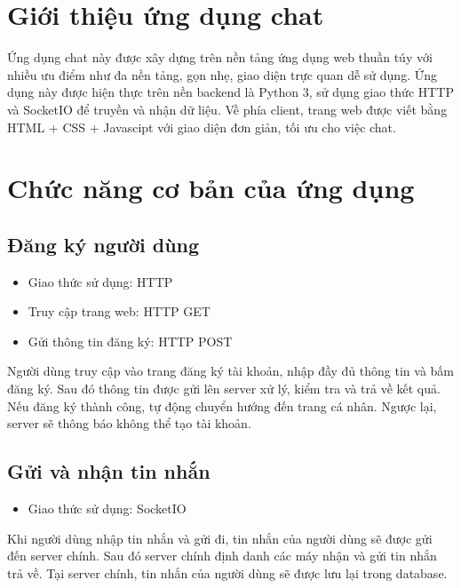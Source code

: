 \documentclass[a4paper]{article}
\begin{document}

\newpage
\tableofcontents
\newpage
\section{Giới thiệu ứng dụng chat}
	Ứng dụng chat này được xây dựng trên nền tảng ứng dụng web thuần túy với nhiều ưu điểm như đa nền tảng, gọn nhẹ, giao diện trực quan dễ sử dụng. Ứng dụng này được hiện thực trên nền backend là Python 3, sử dụng giao thức HTTP và SocketIO để truyền và nhận dữ liệu. Về phía client, trang web được viết bằng HTML + CSS + Javascipt với giao diện đơn giản, tối ưu cho việc chat.
	
\section{Chức năng cơ bản của ứng dụng}
	\subsection{Đăng ký người dùng}
		\begin{itemize}
			\item Giao thức sử dụng: HTTP
			\item Truy cập trang web: HTTP GET
			\item Gửi thông tin đăng ký: HTTP POST
		\end{itemize}
	
	Người dùng truy cập vào trang đăng ký tài khoản, nhập đầy đủ thông tin và bấm đăng ký. Sau đó thông tin được gửi lên server xử lý, kiểm tra và trả về kết quả. Nếu đăng ký thành công, tự động chuyển hướng đến trang cá nhân. Ngược lại, server sẽ thông báo không thể tạo tài khoản.
	
	\subsection{Gửi và nhận tin nhắn}
	\begin{itemize}
		\item Giao thức sử dụng: SocketIO
	\end{itemize}
	
	Khi người dùng nhập tin nhắn và gửi đi, tin nhắn của người dùng sẽ được gửi đến server chính. Sau đó server chính định danh các máy nhận và gửi tin nhắn trả về.\linebreak
	Tại server chính, tin nhắn của người dùng sẽ được lưu lại trong database.
	
\end{document}
